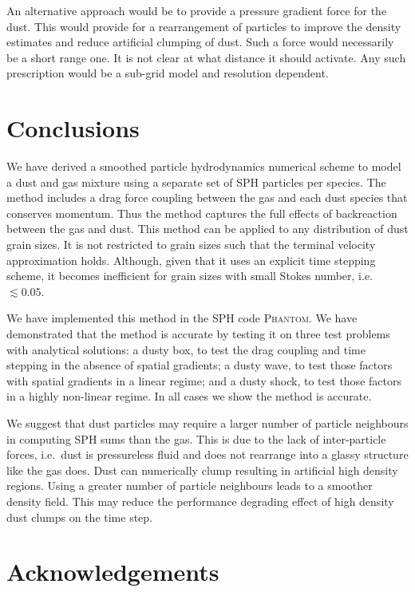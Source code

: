 \documentclass[fleqn,usenatbib]{mnras}
\begin{document}
An alternative approach would be to provide a pressure gradient force for the
dust. This would provide for a rearrangement of particles to improve the density
estimates and reduce artificial clumping of dust. Such a force would necessarily
be a short range one. It is not clear at what distance it should activate. Any
such prescription would be a sub-grid model and resolution dependent.


\section{Conclusions}

We have derived a smoothed particle hydrodynamics numerical scheme to model a
dust and gas mixture using a separate set of SPH particles per species. The
method includes a drag force coupling between the gas and each dust species that
conserves momentum. Thus the method captures the full effects of backreaction
between the gas and dust. This method can be applied to any distribution of dust
grain sizes. It is not restricted to grain sizes such that the terminal velocity
approximation holds. Although, given that it uses an explicit time stepping
scheme, it becomes inefficient for grain sizes with small Stokes number, i.e.
\(\lesssim 0.05\).

We have implemented this method in the SPH code \textsc{Phantom}. We have
demonstrated that the method is accurate by testing it on three test problems
with analytical solutions: a dusty box, to test the drag coupling and time
stepping in the absence of spatial gradients; a dusty wave, to test those
factors with spatial gradients in a linear regime; and a dusty shock, to test
those factors in a highly non-linear regime. In all cases we show the method is
accurate.

We suggest that dust particles may require a larger number of particle
neighbours in computing SPH sums than the gas. This is due to the lack of
inter-particle forces, i.e.\ dust is pressureless fluid and does not rearrange
into a glassy structure like the gas does. Dust can numerically clump resulting
in artificial high density regions. Using a greater number of particle
neighbours leads to a smoother density field. This may reduce the performance
degrading effect of high density dust clumps on the time step.


\section*{Acknowledgements}
\end{document}
